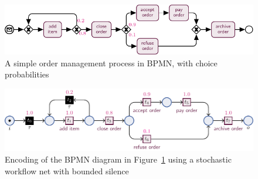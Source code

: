 \begin{figure}[!t]
	\centering
	\includegraphics[width=\textwidth]{images/bpmn-order}
	\caption{A simple order management process in BPMN, with choice probabilities}\label{fig:bpmn-order}
\end{figure}
\begin{figure}[!t] 
		\centering
	\includegraphics[width=\textwidth]{images/petri_order}
	\caption{Encoding of the BPMN diagram in Figure~\ref{fig:bpmn-order} using a stochastic workflow net with bounded silence}\label{fig:petri_tut}
\end{figure}

%	
